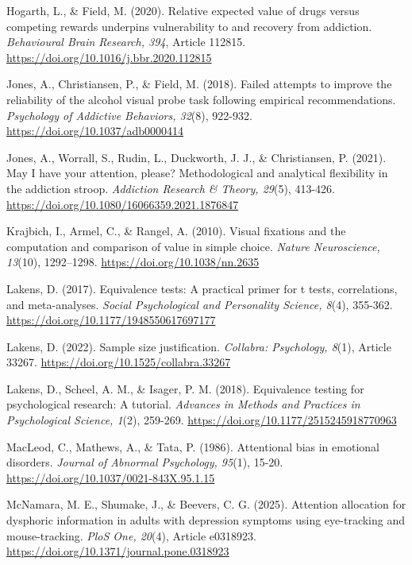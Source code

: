 \documentclass[authordate, empirical]{jote-new-article}
\begin{document}
	Hogarth, L., \& Field, M. (2020). Relative expected value of drugs versus competing rewards underpins vulnerability to and recovery from addiction. \emph{Behavioural Brain Research, 394}, Article 112815. \url{https://doi.org/10.1016/j.bbr.2020.112815}



	Jones, A., Christiansen, P., \& Field, M. (2018). Failed attempts to improve the reliability of the alcohol visual probe task following empirical recommendations. \emph{Psychology of Addictive Behaviors, 32}(8), 922-932. \url{https://doi.org/10.1037/adb0000414}



	Jones, A., Worrall, S., Rudin, L., Duckworth, J. J., \& Christiansen, P. (2021). May I have your attention, please? Methodological and analytical flexibility in the addiction stroop. \emph{Addiction Research \& Theory, 29}(5), 413-426. \url{https://doi.org/10.1080/16066359.2021.1876847}



	Krajbich, I., Armel, C., \& Rangel, A. (2010). Visual fixations and the computation and comparison of value in simple choice. \emph{Nature Neuroscience, 13}(10), 1292--1298. \url{https://doi.org/10.1038/nn.2635}



	Lakens, D. (2017). Equivalence tests: A practical primer for t tests, correlations, and meta-analyses. \emph{Social Psychological and Personality Science, 8}(4), 355-362. \url{https://doi.org/10.1177/1948550617697177}



	Lakens, D. (2022). Sample size justification. \emph{Collabra: Psychology, 8}(1), Article 33267. \url{https://doi.org/10.1525/collabra.33267}



	Lakens, D., Scheel, A. M., \& Isager, P. M. (2018). Equivalence testing for psychological research: A tutorial. \emph{Advances in Methods and Practices in Psychological Science, 1}(2), 259-269. \url{https://doi.org/10.1177/2515245918770963}



	MacLeod, C., Mathews, A., \& Tata, P. (1986). Attentional bias in emotional disorders. \emph{Journal of Abnormal Psychology, 95}(1), 15-20. \url{https://doi.org/10.1037/0021-843X.95.1.15}



	McNamara, M. E., Shumake, J., \& Beevers, C. G. (2025). Attention allocation for dysphoric information in adults with depression symptoms using eye-tracking and mouse-tracking. \emph{PloS One, 20}(4), Article e0318923. \url{https://doi.org/10.1371/journal.pone.0318923}
\end{document}
